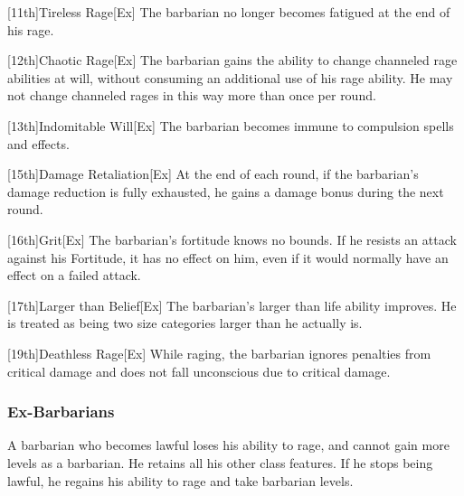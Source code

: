 [11th]{Tireless Rage}[Ex]
The barbarian no longer becomes fatigued at the end of his rage.

[12th]{Chaotic Rage}[Ex]
The barbarian gains the ability to change channeled rage abilities at will, without consuming an additional use of his rage ability.
He may not change channeled rages in this way more than once per round.

[13th]{Indomitable Will}[Ex]
The barbarian becomes immune to compulsion spells and effects.

[15th]{Damage Retaliation}[Ex]
At the end of each round, if the barbarian's damage reduction is fully exhausted, he gains a  damage bonus during the next round.

[16th]{Grit}[Ex]
The barbarian's fortitude knows no bounds.
If he resists an attack against his Fortitude, it has no effect on him, even if it would normally have an effect on a failed attack.

[17th]{Larger than Belief}[Ex]
The barbarian's larger than life ability improves.
He is treated as being two size categories larger than he actually is.

[19th]{Deathless Rage}[Ex]
While raging, the barbarian ignores penalties from critical damage and does not fall unconscious due to critical damage.

\subsubsection{Ex-Barbarians}
A barbarian who becomes lawful loses his ability to rage, and cannot gain more levels as a barbarian.
He retains all his other class features.
If he stops being lawful, he regains his ability to rage and take barbarian levels.

